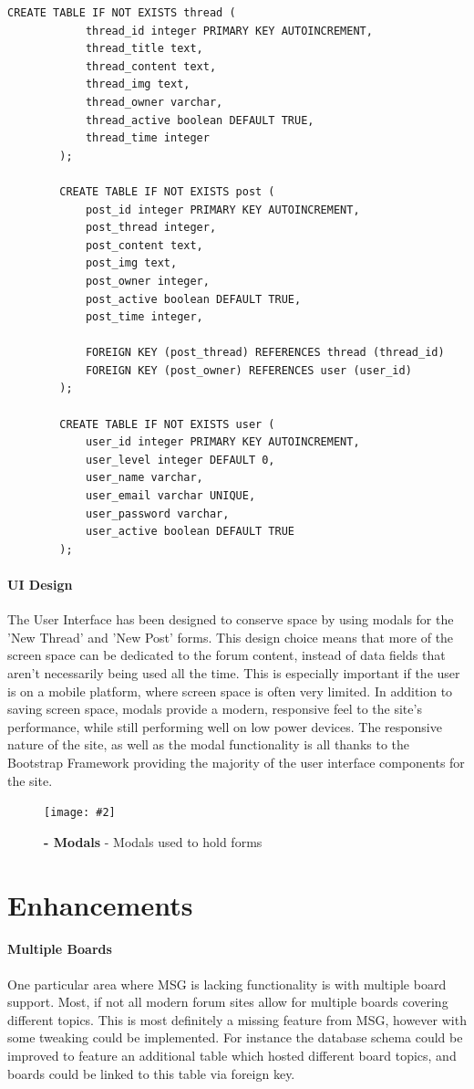 \documentclass[10pt, a4paper]{article}
\newcommand{\figuremacro}[5]{
    \begin{figure}[#1]
        \centering
        \texttt{[image: \#2]}
        \caption[#3]{\textbf{#3}#4}
        \label{fig:#2}
    \end{figure}
}
\begin{document}
	\begin{lstlisting}[caption = SQLite Database Schema]
	    CREATE TABLE IF NOT EXISTS thread (
        	thread_id integer PRIMARY KEY AUTOINCREMENT,
        	thread_title text,
        	thread_content text,
        	thread_img text,
        	thread_owner varchar,
        	thread_active boolean DEFAULT TRUE,
        	thread_time integer
        );
        
        CREATE TABLE IF NOT EXISTS post (
        	post_id integer PRIMARY KEY AUTOINCREMENT,
        	post_thread integer,
        	post_content text,
        	post_img text,
        	post_owner integer,
        	post_active boolean DEFAULT TRUE,
        	post_time integer,
        
        	FOREIGN KEY (post_thread) REFERENCES thread (thread_id)
        	FOREIGN KEY (post_owner) REFERENCES user (user_id)
        );
        
        CREATE TABLE IF NOT EXISTS user (
        	user_id integer PRIMARY KEY AUTOINCREMENT,
        	user_level integer DEFAULT 0,
        	user_name varchar,
        	user_email varchar UNIQUE,
        	user_password varchar,
        	user_active boolean DEFAULT TRUE
        );
	\end{lstlisting}
	
	\paragraph{UI Design}
	The User Interface has been designed to conserve space by using modals for the 'New Thread' and 'New Post'  forms. This design choice means that more of the screen space can be dedicated to the forum content, instead of data fields that aren't necessarily being used all the time. This is especially important if the user is on a mobile platform, where screen space is often very limited. In addition to saving screen space, modals provide a modern, responsive feel to the site's performance, while still performing well on low power devices. The responsive nature of the site, as well as the modal functionality is all thanks to the Bootstrap Framework\cite{bootstrap} providing the majority of the user interface components for the site.
	
	\figuremacro{h}{modal}{- Modals}{ - Modals used to hold forms}{1.0}
	
	\section{Enhancements}
	\paragraph{Multiple Boards}
	One particular area where MSG is lacking functionality is with multiple board support. Most, if not all modern forum sites allow for multiple boards covering different topics. This is most definitely a missing feature from MSG, however with some tweaking could be implemented. For instance the database schema could be improved to feature an additional table which hosted different board topics, and boards could be linked to this table via foreign key.
\end{document}
